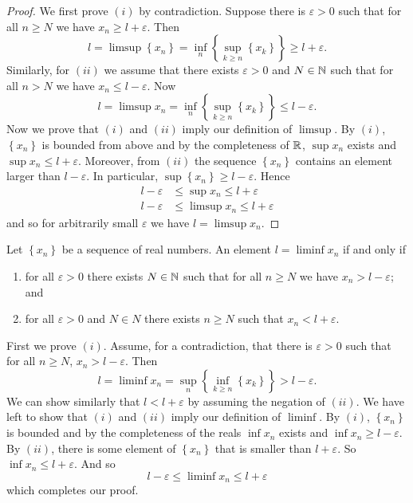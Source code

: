 \begin{proof}
	We first prove $(i)$ by contradiction.
	Suppose there is $\varepsilon > 0$ such that for all $n \geq N$
	we have $x_n \geq l + \varepsilon$.
	Then \[
		l = \limsup\left\{ x_n \right\} 
		= \inf_n\left\{ \sup_{k\geq n} \left\{ x_k \right\} \right\}
		\geq l + \varepsilon.
	\]
	Similarly, for $(ii)$
	we assume that there exists $\varepsilon > 0$ and $N \in \mathbb{N}$
	such that for all $n > N$ we have $x_n \leq l - \varepsilon$.
	Now \[
		l = \limsup x_n
		= \inf_n \left\{ \sup_{k \geq n} \left\{ x_k \right\} \right\}
		\leq l - \varepsilon.
	\]
	Now we prove that $(i)$ and $(ii)$ imply our definition of $\limsup$.
	By $(i)$, $\left\{ x_n \right\}$ is bounded from above and by the
	completeness of $\mathbb{R}$, $\sup x_n$ exists and $\sup x_n \leq l + \varepsilon$.
	Moreover, from $(ii)$ the sequence $\left\{ x_n \right\}$ contains an element
	larger than $l - \varepsilon$.
	In particular,
	$\sup\left\{ x_n \right\} \geq l - \varepsilon$.
	Hence 
	\begin{align*}
		l - \varepsilon &\leq \sup x_n \leq l + \varepsilon \\ 
		l - \varepsilon &\leq \limsup x_n \leq l + \varepsilon
	\end{align*}
	and so for arbitrarily small $\varepsilon$ we have $l = \limsup x_n$.
\end{proof}

\begin{proposition}[]
	Let $\left\{ x_n \right\}$ be a sequence of real numbers.
	An element $l = \liminf x_n$ if and only if
	\begin{enumerate}
		\item for all $\varepsilon > 0$ there exists $N \in \mathbb{N}$ such that
			for all $n \geq N$ we have $x_n > l - \varepsilon$; and
		\item for all $\varepsilon > 0$ and $N \in N$ there exists
			$n \geq N$ such that $x_n < l + \varepsilon$.
	\end{enumerate}
\end{proposition}

\begin{solution}
	First we prove $(i)$.
	Assume, for a contradiction, that there is $\varepsilon > 0$ such that for
	all $n \geq N$, $x_n > l - \varepsilon$.
	Then \[
		l = \liminf x_n
		= \sup_n\left\{ \inf_{k\geq n}\left\{ x_k \right\} \right\}
		> l - \varepsilon.
	\]
	We can show similarly that $l < l + \varepsilon$
	by assuming the negation of $(ii)$.
	We have left to show that $(i)$ and $(ii)$ imply our definition of $\liminf$.
	By $(i)$, $\left\{ x_n \right\}$ is bounded and by the completeness of the
	reals $\inf x_n$ exists and $\inf x_n \geq l - \varepsilon$.
	By $(ii)$, there is some element of $\left\{ x_n \right\}$ that is smaller
	than $l + \varepsilon$. 
	So $\inf x_n \leq l + \varepsilon$.
	And so \[
		l - \varepsilon \leq \liminf x_n \leq l + \varepsilon
	\]
	which completes our proof.
\end{solution}

